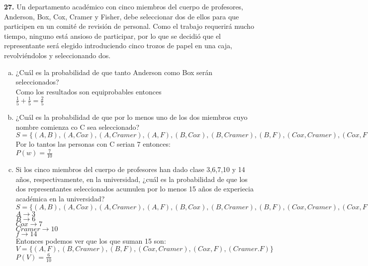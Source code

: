 \documentclass[12pt, letterpaper, spanish]{article}
\begin{document}
\textbf{27.} Un departamento académico con cinco miembros del cuerpo de profesores, Anderson, Box, Cox, Cramer y Fisher, debe seleccionar dos de ellos para que participen en un comité de revisión de personal. Como el trabajo requerirá mucho tiempo, ninguno está ansioso de participar, por lo que se decidió  que el representante será elegido introduciendo cinco trozos de papel en una caja, revolviéndolos y seleccionando dos.
\begin{enumerate}[a)]
    \item ¿Cuál es la probabilidad de que tanto Anderson como Box serán seleccionados?\\
    Como los resultados son equiprobables entonces\\
    $\frac{1}{5}+\frac{1}{5} = \frac{2}{5}$
    \item ¿Cuál es la probabilidad de que por lo menos uno de los dos miembros cuyo nombre comienza co C sea seleccionado?\\
    $S= \lbrace (A,B), (A,Cox), (A,Cramer), (A,F), (B,Cox), (B,Cramer), (B,F), (Cox,Cramer), (Cox,F), (Cramer.F) \rbrace$
    Por lo tantos las personas con C serian 7 entonces:\\
    $P(w)=\frac{7}{10}$
    \item Si los cinco miembros del cuerpo de profesores han dado clase 3,6,7,10 y 14 años, respectivamente, en la universidad, ¿cuál es la probabilidad de que los dos representantes seleccionados acumulen por lo menos 15 años de experiecia académica en la universidad?
    $S= \lbrace (A,B), (A,Cox), (A,Cramer), (A,F), (B,Cox), (B,Cramer), (B,F), (Cox,Cramer), (Cox,F), (Cramer.F) \rbrace$ \\
    $A\longrightarrow 3$\\
    $B\longrightarrow 6$\\
    $Cox\longrightarrow 7$\\
    $Cramer\longrightarrow 10$\\
    $f\longrightarrow 14$\\

	Entonces podemos ver que los que suman 15 son:\\
	    $V= \lbrace (A,F), (B,Cramer), (B,F), (Cox,Cramer), (Cox,F), (Cramer.F) \rbrace$ \\
	    $P(V)=\frac{6}{10}$
\end{enumerate}
\end{document}
